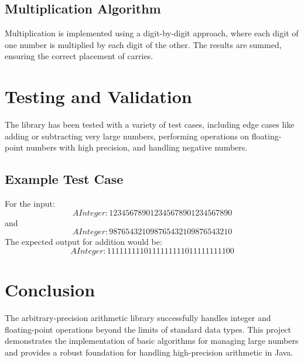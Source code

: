 \documentclass[12pt]{article}
\begin{document}
\subsection*{Multiplication Algorithm}
Multiplication is implemented using a digit-by-digit approach, where each digit of one number is multiplied by each digit of the other. The results are summed, ensuring the correct placement of carries.

\section*{Testing and Validation}
The library has been tested with a variety of test cases, including edge cases like adding or subtracting very large numbers, performing operations on floating-point numbers with high precision, and handling negative numbers.

\subsection*{Example Test Case}
For the input:
\[
AInteger: 123456789012345678901234567890
\]
and
\[
AInteger: 987654321098765432109876543210
\]
The expected output for addition would be:
\[
AInteger: 1111111110111111111011111111100
\]

\section*{Conclusion}
The arbitrary-precision arithmetic library successfully handles integer and floating-point operations beyond the limits of standard data types. This project demonstrates the implementation of basic algorithms for managing large numbers and provides a robust foundation for handling high-precision arithmetic in Java.
\end{document}
